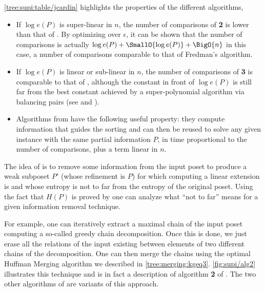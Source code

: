 \ref{tree:supi:table/jcardin} highlights the properties of the different
algorithms, \ie

\begin{itemize}

\item If $\log e(P)$ is super-linear in $n$, the number of comparisons of
\citet*{cardinal:2013} \textbf{2} is lower than that of \citet*{kahn:1995}. By
optimizing over $\epsilon$, it can be shown that the number of comparisons is
actually $\log e(P) + \SmallO{\log e(P)} + \BigO{n}$ in this case, a number of
comparisons comparable to that of Fredman’s algorithm.

\item If $\log e(P)$ is linear or sub-linear in $n$, the number of comparisons
of \citet*{cardinal:2013} \textbf{3} is comparable to that of
\citet*{kahn:1995}, although the constant in front of $\log e(P)$ is still far
from the best constant achieved by a super-polynomial algorithm via balancing
pairs (see \citet*{brightwell1995balancing} and
\citet*{brightwell1999balanced}).

\item Algorithms from \citet*{cardinal:2013} have the following useful
property: they compute information that guides the sorting and can then be
reused to solve any given instance with the same partial information $P$, in
time proportional to the number of comparisons, plus a term linear in $n$.

\end{itemize}

The idea of \citet*{cardinal:2013} is to remove some information from the input
poset to produce a weak subposet \(P'\) (whose refinement is \(P\)) for which
computing a linear extension is  and whose entropy is not to
far from the entropy of the original poset. Using the fact that \(H(P)\) is
 proved by \citet*{kahn:1995} one can analyze what ``not to
far'' means for a given information removal technique.

For example, one can iteratively extract a maximal chain of the input poset
computing a so-called greedy chain decomposition. Once this is done, we just
erase all the relations of the input existing between elements of two different
chains of the decomposition. One can then merge the chains using the optimal
Huffman Merging algorithm we described in \ref{tree:merging:kgeq3}.
\ref{fig:supi/alg2} illustrates this technique and is in fact a description of
algorithm \textbf{2} of \citet{cardinal:2013}. The two other algorithms of
\citet*{cardinal:2013} are variants of this approach.

